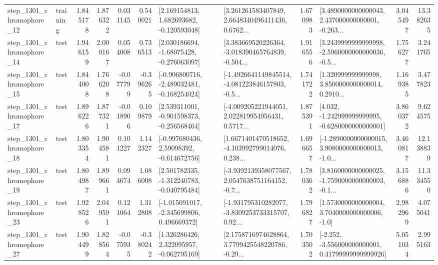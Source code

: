 \begin{tabular}{llrrrrllrlrr}
 step\_1301\_chromophore\_12 &  training &      1.845178 &    1.876322 &      0.031145 &  0.540021 &    [2.169154813, 1.682693682, -0.120593048] &  [3.261261583407849, 2.6648340496411436, 0.6762... &       1.670983 &  [3.4890000000000043, 2.437000000000001, -0.263... &            3.045497 &         13.382635 \\
 step\_1301\_chromophore\_14 &      test &      1.946159 &    2.000167 &      0.054008 &  0.736513 &    [2.030186694, -1.68075428, -0.276063097] &  [3.383669520226364, -3.018390465764839, -0.504... &       1.916556 &  [3.2439999999999998, -2.5960000000000036, -0.5... &            1.756277 &          3.241765 \\
 step\_1301\_chromophore\_15 &      test &      1.844008 &    1.766208 &     -0.077799 & -0.396265 &  [-0.906800716, -2.489032481, -0.168254024] &  [-1.4926641149845514, -4.081223846157803, -0.5... &       1.741722 &  [1.320999999999998, 3.8500000000000014, 0.2910... &            1.169385 &          3.477823 \\
 step\_1301\_chromophore\_17 &      test &      1.896226 &    1.877321 &     -0.018906 &  0.109879 &   [2.539311001, -0.901598373, -0.256568464] &  [-4.009205221944051, 2.022819954956431, 0.5717... &       1.875391 &   [4.032, -1.242999999999995, -0.6280000000000001] &            3.860372 &          9.624575 \\
 step\_1301\_chromophore\_18 &      test &      1.803354 &    1.904581 &      0.101227 &  1.142327 &    [-0.997680436, 2.59098392, -0.614672756] &  [1.6671401470518652, -4.103992799014076, 0.238... &       1.696657 &  [-1.2890000000000015, 3.9080000000000013, -1.0... &            3.460817 &         12.138839 \\
 step\_1301\_chromophore\_19 &      test &      1.804987 &    1.899661 &      0.094674 &  1.086008 &   [2.501782335, -1.312240783, -0.040795484] &  [-3.9392139358077567, 2.0547638751164152, -0.7... &       1.780362 &  [3.8160000000000025, -1.7590000000000003, -0.1... &            3.156886 &         11.334550 \\
 step\_1301\_chromophore\_23 &      test &      1.928526 &    2.049591 &      0.121064 &  1.312808 &   [-1.015091017, -2.345699806, 0.496669372] &  [-1.931795310282077, -3.8309253733315707, 0.92... &       1.796827 &     [1.5730000000000004, 3.7040000000000006, -1.0] &            2.982969 &          4.075041 \\
 step\_1301\_chromophore\_27 &      test &      1.904499 &    1.828564 &     -0.075935 & -0.380242 &    [1.326286426, 2.322095957, -0.062795169] &  [2.1758716974628864, 3.7799425548220786, -0.29... &       1.703502 &  [-2.252, -3.556000000000001, 0.41799999999999926] &            5.051034 &          2.995163 \\

\end{tabular}

